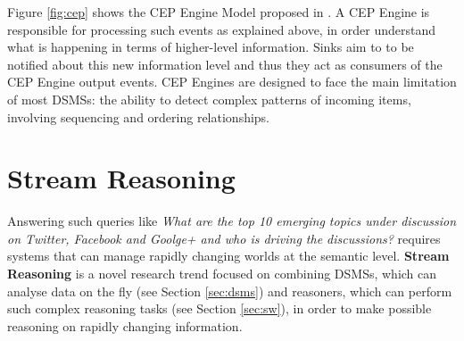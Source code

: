 Figure \ref{fig:cep} shows the CEP Engine Model proposed in \cite{Cugola:2012:PFI:2187671.2187677}. A CEP Engine is responsible for processing such events as explained above, in order understand what is happening in terms of higher-level information. Sinks aim to   to be notified  about this new information level and thus they act as consumers of the CEP Engine output events. 
CEP Engines are designed to face the main limitation of most DSMSs: the ability to detect complex patterns of incoming items, involving sequencing and ordering relationships.

\section{Stream Reasoning}\label{sec:sfp}

Answering such queries like \textit{What are the top 10 emerging topics under discussion on Twitter, Facebook and Goolge+ and who is driving the discussions?} requires systems that can manage rapidly changing worlds at the semantic level. \textbf{Stream Reasoning} is a novel research trend focused on combining DSMSs, which can analyse data on the fly (see Section \ref{sec:dsms}) and reasoners, which can perform such complex reasoning tasks (see Section \ref{sec:sw}), in order to make possible reasoning on rapidly changing information.



